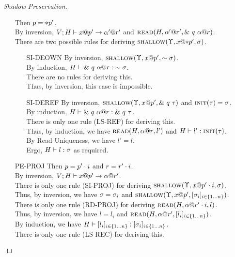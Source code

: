\begin{proof}[Shadow Preservation]
\begin{itemize}
      Then $p = *{p'}$.\\
      By inversion, ${V;H} \vdash {{x}@{p'}} \to {{\alpha'}@{r'}}$
      and $\textsc{read}({H},{{\alpha'}@{r'}},{\&~{{q}~{{\alpha}@{r}}}})$.\\
      There are two possible rules for deriving $\textsc{shallow}({\Upsilon},{{x}@{*{p'}}},{\sigma})$.
      \begin{itemize}
	\item[\textsc{SI-DEOWN}]
	  By inversion, $\textsc{shallow}({\Upsilon},{{x}@{p'}},{\sim{\sigma}})$.\\
	  By induction, ${H} \vdash {\&~{{q}~{{\alpha}@{r}}}} : {\sim{\sigma}}$.\\
	  There are no rules for deriving this.\\
	  Thus, by inversion, this case is impossible.
	\item[\textsc{SI-DEREF}]
	  By inversion, $\textsc{shallow}({\Upsilon},{{x}@{p'}},{\&~{{q}~{\tau}}})$ 
	  and $\textsc{init}({\tau})=\sigma$.\\
	  By induction, ${H} \vdash {\&~{{q}~{{\alpha}@{r}}}} : {\&~{{q}~{\tau}}}$.\\
	  There is only one rule (\textsc{LS-REF}) for deriving this.\\
	  Thus, by induction, we have $\textsc{read}({H},{{\alpha}@{r}},{l'})$
	  and ${H} \vdash {l'} : {\textsc{init}({\tau})}$.\\
	  By Read Uniqueness, we have $l' = l$.\\
	  Ergo, ${H} \vdash {l} : {\sigma}$ as required.
      \end{itemize}
    \item[\textsc{PE-PROJ}] 
      Then $p = {p'}\cdot{i}$ and $r = {r'}\cdot{i}$.\\
      By inversion, ${V;H} \vdash {{x}@{p'}} \to {{\alpha}@{r'}}$.\\
      There is only one rule (\textsc{SI-PROJ}) for 
      deriving $\textsc{shallow}({\Upsilon},{{x}@{{p'}\cdot{i}}},{\sigma})$.\\
      Thus, by inversion, we have $\sigma=\sigma_i$ and
      $\textsc{shallow}({\Upsilon},{{x}@{p'}},{[{{\sigma}_{i}}]_{{i} \in \{1 \ldots {n}\} }})$.\\
      There is only one rule (\textsc{RD-PROJ}) for 
      deriving $\textsc{read}({H},{{\alpha}@{{r'}\cdot{i}}},{l})$.\\
      Thus, by inversion, we have $l=l_i$ and
      $\textsc{read}({H},{{\alpha}@{r'}},{[{{l}_{i}}]_{{i} \in \{1 \ldots {n}\} }})$.\\
      By induction, we have ${H} \vdash {[{{l}_{i}}]_{{i} \in \{1 \ldots {n}\} }} : {[{{\sigma}_{i}}]_{{i} \in \{1 \ldots {n}\} }}$.\\
      There is only one rule (\textsc{LS-REC}) for deriving this.\\

\end{itemize}
\end{proof}
